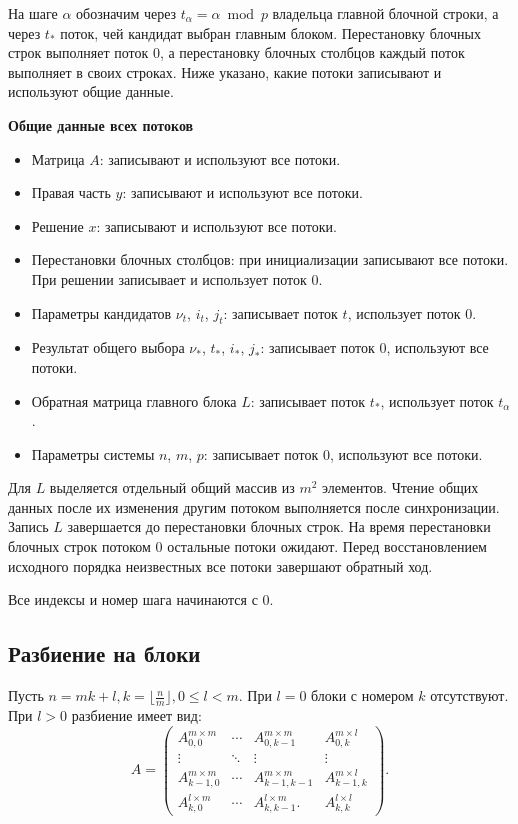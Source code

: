 \documentclass[a4paper,12pt]{article}
\begin{document}
На шаге $\alpha$ обозначим через $t_\alpha = \alpha \bmod p$ владельца главной блочной строки, а через $t_*$ поток, чей кандидат выбран главным блоком. Перестановку блочных строк выполняет поток $0$, а перестановку блочных столбцов каждый поток выполняет в своих строках. Ниже указано, какие потоки записывают и используют общие данные.

\textbf{Общие данные всех потоков}
\begin{itemize}
    \item Матрица $A$: записывают и используют все потоки.
    \item Правая часть $y$: записывают и используют все потоки.
    \item Решение $x$: записывают и используют все потоки.
    \item Перестановки блочных столбцов: при инициализации записывают все потоки. При решении записывает и использует поток $0$.
    \item Параметры кандидатов $\nu_t$, $i_t$, $j_t$: записывает поток $t$, использует поток $0$.
    \item Результат общего выбора $\nu_*$, $t_*$, $i_*$, $j_*$: записывает поток $0$, используют все потоки.
    \item Обратная матрица главного блока $L$: записывает поток $t_*$, использует поток $t_\alpha$.
    \item Параметры системы $n$, $m$, $p$: записывает поток $0$, используют все потоки.
\end{itemize}

Для $L$ выделяется отдельный общий массив из $m^2$ элементов. Чтение общих данных после их изменения другим потоком выполняется после синхронизации. Запись $L$ завершается до перестановки блочных строк. На время перестановки блочных строк потоком $0$ остальные потоки ожидают. Перед восстановлением исходного порядка неизвестных все потоки завершают обратный ход.

Все индексы и номер шага начинаются с $0$.
\subsection{Разбиение на блоки}
Пусть $n = m k + l, k = \lfloor \frac{n}{m} \rfloor, 0 \leq l < m$. При $l = 0$ блоки с номером $k$ отсутствуют. При $l > 0$ разбиение имеет вид:
\[
    A =
    \begin{pmatrix}
        A_{0, 0}^{m \times m} & \cdots & A_{0, k - 1}^{m \times m} & A_{0, k}^{m \times l}     \\
        \vdots & \ddots & \vdots & \vdots                    \\
        A_{k - 1, 0}^{m \times m} & \cdots & A_{k - 1, k - 1}^{m \times m} & A_{k - 1, k}^{m \times l} \\
        A_{k, 0}^{l \times m} & \cdots & A_{k, k - 1}^{l \times m}. & A_{k, k}^{l \times l}
    \end{pmatrix}.
\]
\end{document}
